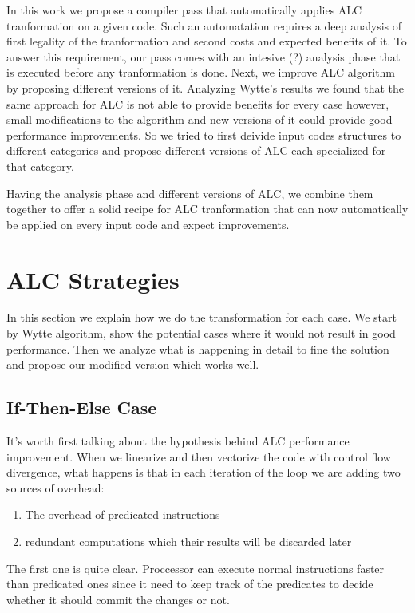 \documentclass[\main/thesis.tex]{subfiles}
\begin{document}
In this work we propose a compiler pass that automatically applies ALC tranformation on a given code. Such an automatation requires a deep analysis of first legality of the tranformation and second costs and expected benefits of it. To answer this requirement, our pass comes with an intesive (?) analysis phase that is executed before any tranformation is done. Next, 
we improve ALC algorithm by proposing different versions of it. Analyzing Wytte's results we found that the same approach for ALC is not able to provide benefits for every case however, small modifications to the algorithm and new versions of it could provide good performance improvements. So we tried to first deivide input codes structures to different categories and
propose different versions of ALC each specialized for that category.

Having the analysis phase and different versions of ALC, we combine them together to offer a solid recipe for ALC tranformation that can now automatically be applied on every input code and expect improvements.


\section{ALC Strategies}

In this section we explain how we do the transformation for each case. We start by Wytte algorithm, show the potential cases where it would not result in good performance. Then we analyze what is happening in detail to fine the solution and propose our modified version which works well.

\subsection{If-Then-Else Case}
It's worth first talking about the hypothesis behind ALC performance improvement. When we linearize and then vectorize the code with control flow divergence, what happens is that in each iteration of the loop we are adding two sources of overhead:
\begin{enumerate}
    \item The overhead of predicated instructions
    \item redundant computations which their results will be discarded later 
\end{enumerate}

The first one is quite clear. Proccessor can execute normal instructions faster than predicated ones since it need to keep track of the predicates to decide whether it should commit the changes or not.
\end{document}
